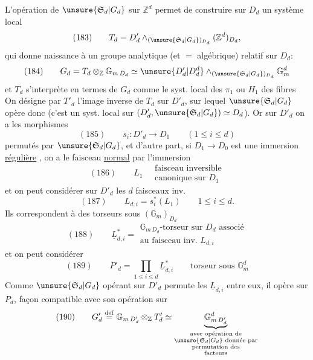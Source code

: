 L'opération de $\unsure{\mathfrak S_d|G_d}$ sur $\mathbb Z^d$ permet de construire sur $D_d$ un système local
\[
(183)\qquad T_d=D'_d\mathbin\wedge_{(\unsure{\mathfrak S_d|G_d})_{D_d}}(\mathbb Z^d)_{D_d},
\]
 qui donne naissance à un groupe analytique (et $=$ algébrique) relatif sur $D_d$:
\[
(184)\qquad G_d=T_d\otimes_{\mathbb Z}\mathbb G_{m\,D_d}\simeq\unsure{D'_d|D_d^d}\mathbin\wedge_{(\unsure{\mathfrak S_d|G_d})_{D_d}}\mathbb G_m^d
\]
 et $T_d$ s'interprète en termes de $G_d$ comme le syst. local des $\pi_1$ ou $H_1$ des fibres
On désigne par $T'_d$ l'image inverse de $T_d$ sur $D'_d$, sur lequel $\unsure{\mathfrak S_d|G_d}$ opère donc (c'est un  syst. local sur $(D'_d,\unsure{\mathfrak S_d|G_d})\simeq D_d$). Or sur $D'_d$ on a les  morphismes
\[
(185)\qquad s_i:D'_d\longrightarrow D_1\qquad(1\leq i\leq d)
\]
permutés par $\unsure{\mathfrak S_d|G_d}$, et d'autre part, si $D_1\longrightarrow D_0$ est une immersion \uline{régulière} , on a  le faisceau \uline{normal} par l'immersion
\[
(186)\qquad L_1\quad\begin{gathered}\text{faisceau inversible}\\\text{canonique sur }D_1\end{gathered}
\]
et on peut considérer sur $D'_d$ les $d$ faisceaux inv.
\[
(187)\qquad L_{d,i}=s_i^*(L_1)\qquad1\leq i\leq d.
\]
Ils correspondent à des torseurs sous $(\mathbb G_m)_{D_d}$
\[
(188)\qquad\underline L_{d,i}^*=\begin{gathered}\mathbb G_{m\,D_d}\text{-torseur sur }D_d\text{ associé}\\\text{au faisceau inv. }L_{d,i}
\end{gathered}
\]
et on peut considérer
\[
(189)\qquad P'_d=\prod_{1\leq i\leq d}\underline L_{d,i}^*\qquad\text{torseur sous }\mathbb G_m^d
\]
Comme $\unsure{\mathfrak S_d|G_d}$ opérant sur $D'_d$ permute les  $\underline L_{d,i}$ entre eux, il opère sur $P_d$,    façon compatible avec son opération sur
\[
(190)\qquad G'_d\overset{\mathrm{def}}{=}\mathbb G_{m\,D'_d}\otimes_{\mathbb Z}T'_d\simeq\underbrace{\mathbb G^{d}_{m\,D'_d}}_{\substack{\text{avec opération de}\\\unsure{\mathfrak S_d|G_d}\text{ donnée par}\\\text{permutation des}\\\text{facteurs}}}
\]
